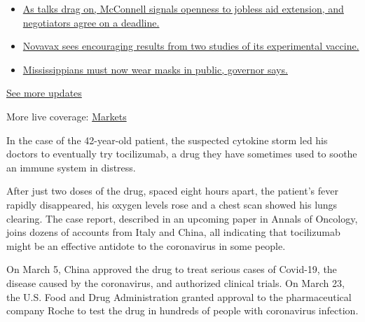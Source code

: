 \begin{itemize}
\tightlist
\item
  \href{https://www.nytimes3xbfgragh.onion/2020/08/04/world/coronavirus-cases.html?action=click\&pgtype=Article\&state=default\&region=MAIN_CONTENT_1\&context=storylines_live_updates\#link-762df92}{As
  talks drag on, McConnell signals openness to jobless aid extension,
  and negotiators agree on a deadline.}
\item
  \href{https://www.nytimes3xbfgragh.onion/2020/08/04/world/coronavirus-cases.html?action=click\&pgtype=Article\&state=default\&region=MAIN_CONTENT_1\&context=storylines_live_updates\#link-1228a480}{Novavax
  sees encouraging results from two studies of its experimental
  vaccine.}
\item
  \href{https://www.nytimes3xbfgragh.onion/2020/08/04/world/coronavirus-cases.html?action=click\&pgtype=Article\&state=default\&region=MAIN_CONTENT_1\&context=storylines_live_updates\#link-794484ed}{Mississippians
  must now wear masks in public, governor says.}
\end{itemize}

\href{https://www.nytimes3xbfgragh.onion/2020/08/04/world/coronavirus-cases.html?action=click\&pgtype=Article\&state=default\&region=MAIN_CONTENT_1\&context=storylines_live_updates}{See
more updates}

More live coverage:
\href{https://www.nytimes3xbfgragh.onion/live/2020/08/04/business/stock-market-today-coronavirus?action=click\&pgtype=Article\&state=default\&region=MAIN_CONTENT_1\&context=storylines_live_updates}{Markets}

In the case of the 42-year-old patient, the suspected cytokine storm led
his doctors to eventually try tocilizumab, a drug they have sometimes
used to soothe an immune system in distress.

After just two doses of the drug, spaced eight hours apart, the
patient's fever rapidly disappeared, his oxygen levels rose and a chest
scan showed his lungs clearing. The case report, described in an
upcoming paper in Annals of Oncology, joins dozens of accounts from
Italy and China, all indicating that tocilizumab might be an effective
antidote to the coronavirus in some people.

On March 5, China approved the drug to treat serious cases of Covid-19,
the disease caused by the coronavirus, and authorized clinical trials.
On March 23, the U.S. Food and Drug Administration granted approval to
the pharmaceutical company Roche to test the drug in hundreds of people
with coronavirus infection.

